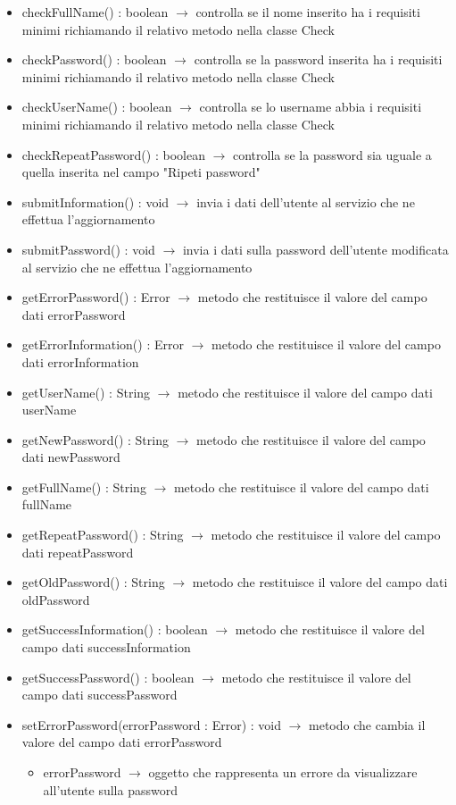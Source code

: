 \begin{description}
\begin{itemize}
	\item checkFullName() : boolean $\rightarrow$ controlla se il nome inserito ha i requisiti minimi richiamando il relativo metodo nella classe Check
	\item checkPassword() : boolean $\rightarrow$ controlla se la password inserita ha i requisiti minimi richiamando il relativo metodo nella classe Check
	\item checkUserName() : boolean $\rightarrow$ controlla se lo username abbia i requisiti minimi richiamando il relativo metodo nella classe Check
	\item checkRepeatPassword() : boolean $\rightarrow$ controlla se la password sia uguale a quella inserita nel campo "Ripeti password"
	\item submitInformation() : void $\rightarrow$ invia i dati dell'utente al servizio che ne effettua l'aggiornamento
	\item submitPassword() : void $\rightarrow$ invia i dati sulla password dell'utente modificata al servizio che ne effettua l'aggiornamento
	\item getErrorPassword() : Error $\rightarrow$ metodo che restituisce il valore del campo dati errorPassword
	\item getErrorInformation() : Error $\rightarrow$ metodo che restituisce il valore del campo dati errorInformation
	\item getUserName() : String $\rightarrow$ metodo che restituisce il valore del campo dati userName
	\item getNewPassword() : String $\rightarrow$ metodo che restituisce il valore del campo dati newPassword
	\item getFullName() : String $\rightarrow$ metodo che restituisce il valore del campo dati fullName
	\item getRepeatPassword() : String $\rightarrow$ metodo che restituisce il valore del campo dati repeatPassword
	\item getOldPassword() : String $\rightarrow$ metodo che restituisce il valore del campo dati oldPassword
	\item getSuccessInformation() : boolean $\rightarrow$ metodo che restituisce il valore del campo dati successInformation
	\item getSuccessPassword() : boolean $\rightarrow$ metodo che restituisce il valore del campo dati successPassword
	\item setErrorPassword(errorPassword : Error) : void $\rightarrow$ metodo che cambia il valore del campo dati errorPassword\begin{itemize}
		\item errorPassword $\rightarrow$ oggetto che rappresenta un errore da visualizzare all'utente sulla password
	\end{itemize}
	

\end{itemize}
\end{description}
